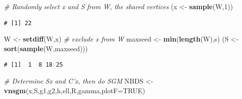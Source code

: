 \documentclass[]{article}
\newenvironment{Shaded}{\begin{snugshade}}{\end{snugshade}}
\newcommand{\KeywordTok}[1]{\textcolor[rgb]{0.13,0.29,0.53}{\textbf{#1}}}
\newcommand{\DataTypeTok}[1]{\textcolor[rgb]{0.13,0.29,0.53}{#1}}
\newcommand{\DecValTok}[1]{\textcolor[rgb]{0.00,0.00,0.81}{#1}}
\newcommand{\StringTok}[1]{\textcolor[rgb]{0.31,0.60,0.02}{#1}}
\newcommand{\CommentTok}[1]{\textcolor[rgb]{0.56,0.35,0.01}{\textit{#1}}}
\newcommand{\OtherTok}[1]{\textcolor[rgb]{0.56,0.35,0.01}{#1}}
\newcommand{\NormalTok}[1]{#1}
\begin{document}
\begin{Shaded}
\begin{Highlighting}[]
\CommentTok{# Randomly select x and S from W, the shared vertices}
\NormalTok{(x <-}\StringTok{ }\KeywordTok{sample}\NormalTok{(W,}\DecValTok{1}\NormalTok{))}
\end{Highlighting}
\end{Shaded}

\begin{verbatim}
# [1] 22
\end{verbatim}

\begin{Shaded}
\begin{Highlighting}[]
\NormalTok{W <-}\StringTok{ }\KeywordTok{setdiff}\NormalTok{(W,x) }\CommentTok{# exclude x from W}
\NormalTok{maxseed <-}\StringTok{ }\KeywordTok{min}\NormalTok{(}\KeywordTok{length}\NormalTok{(W),s)}
\NormalTok{(S <-}\StringTok{ }\KeywordTok{sort}\NormalTok{(}\KeywordTok{sample}\NormalTok{(W,maxseed))) }
\end{Highlighting}
\end{Shaded}

\begin{verbatim}
# [1]  1  8 18 25
\end{verbatim}

\begin{Shaded}
\begin{Highlighting}[]
\CommentTok{# Determine Sx and C'x, then do SGM}
\NormalTok{NBDS <-}\StringTok{ }\KeywordTok{vnsgm}\NormalTok{(x,S,g1,g2,h,ell,R,gamma,}\DataTypeTok{plotF=}\OtherTok{TRUE}\NormalTok{)}
\end{Highlighting}
\end{Shaded}
\end{document}
